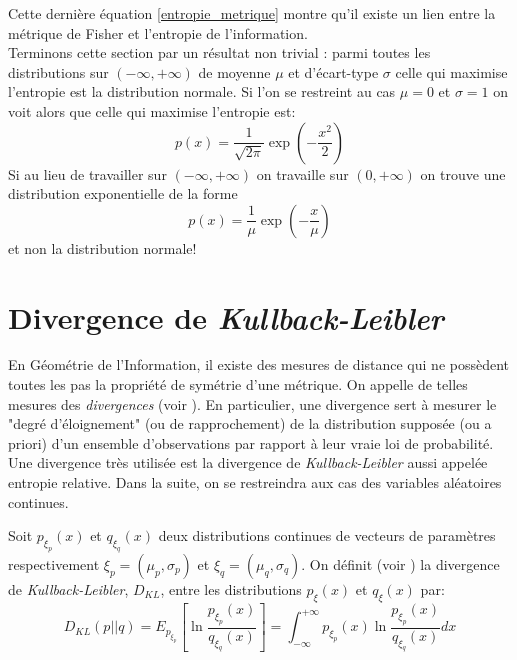 \documentclass[11pt,french]{article}
\begin{document}
Cette dernière équation \eqref{entropie_metrique} montre qu'il existe un lien entre la métrique de Fisher et l'entropie de l'information.\\

Terminons cette section par un résultat non trivial \cite[Théorème 6.5.1]{calin2014geometric}: parmi toutes les distributions sur $(-\infty, +\infty)$ de moyenne $\mu$ et d'écart-type $\sigma$ celle qui maximise l'entropie est la distribution normale. Si l'on se restreint au cas $\mu=0$ et $\sigma=1$ on voit alors que celle qui maximise l'entropie est:
\begin{equation*}
    p(x)=\frac{1}{\sqrt{2\pi}}\exp(-\frac{x^2}{2})
\end{equation*}
Si au lieu de travailler sur $(-\infty, +\infty)$ on travaille sur $(0, +\infty)$ on trouve une distribution exponentielle de la forme 
\begin{equation*}
    p(x)=\frac{1}{\mu}\exp(-\frac{x}{\mu})
\end{equation*}
et non la distribution normale!\\

\section{Divergence de \textit{Kullback-Leibler}}
En Géométrie de l'Information, il existe des mesures de distance qui ne possèdent toutes les pas la propriété de symétrie d'une métrique. On appelle de telles mesures des \textit{divergences} (voir \cite[Section 3.2]{amari2000nethods}). En particulier, une divergence sert à mesurer le "degré d'éloignement" (ou de rapprochement) de la distribution supposée (ou a priori) d'un ensemble d'observations par rapport à leur vraie loi de probabilité. Une divergence très utilisée est la divergence de \textit{Kullback-Leibler} aussi appelée entropie relative. Dans la suite, on se restreindra aux cas des variables aléatoires continues.

Soit $p_{\xi_p}(x)$ et $q_{\xi_q}(x)$ deux distributions continues de vecteurs de paramètres respectivement $\xi_p=(\mu_p, \sigma_p)$ et $\xi_q=(\mu_q, \sigma_q)$. On définit (voir \cite{calin2014geometric}) la divergence de \textit{Kullback-Leibler}, $D_{KL}$, entre les distributions $p_{\xi}(x)$ et $q_{\xi}(x)$ par:
\begin{equation*}
    D_{KL}(p||q)=E_{p_{\xi_p}}\left[\ln\frac{p_{\xi_p}(x)}{q_{\xi_q}(x)}\right]=\int_{-\infty}^{+\infty}p_{\xi_p}(x)\ln\frac{p_{\xi_p}(x)}{q_{\xi_q}(x)}dx
\end{equation*}\\
   
\end{document}
